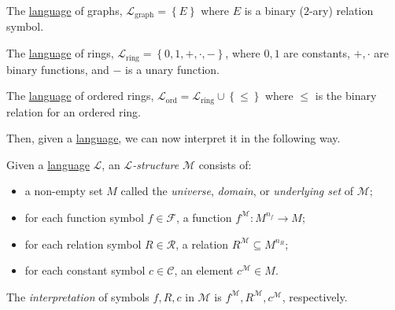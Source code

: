 \begin{eg}[Graph]\label{eg:language-graph}
	The \hyperref[def:language]{language} of graphs, \(\mathcal{L} _{\text{graph} } = \left\{ E \right\}\) where \(E\) is a binary (\(2\)-ary) relation symbol.
\end{eg}

\begin{eg}[Ring]\label{eg:language-ring}
	The \hyperref[def:language]{language} of rings, \(\mathcal{L} _{\text{ring} } = \left\{ 0, 1, +, \cdot, - \right\} \), where \(0, 1\) are constants, \(+, \cdot\) are binary functions, and \(-\) is a unary function.
\end{eg}

\begin{eg}\label{eg:language-ordered-ring}
	The \hyperref[def:language]{language} of ordered rings, \(\mathcal{L} _{\text{ord} } = \mathcal{L} _{\text{ring} } \cup \left\{ \leq \right\} \) where \(\leq \) is the binary relation for an ordered ring.
\end{eg}

Then, given a \hyperref[def:language]{language}, we can now interpret it in the following way.

\begin{definition}[Structure]\label{def:structure}
	Given a \hyperref[def:language]{language} \(\mathcal{L} \), an \emph{\(\mathcal{L} \)-structure} \(\mathcal{M} \) consists of:
	\begin{itemize}
		\item a non-empty set \(M\) called the \emph{universe}, \emph{domain}, or \emph{underlying set} of \(\mathcal{M} \);
		\item for each function symbol \(f\in \mathcal{F} \), a function \(f^{\mathcal{M} } \colon M^{n_f} \to M\);
		\item for each relation symbol \(R\in \mathcal{R} \), a relation \(R^{\mathcal{M} } \subseteq M^{n_R}\);
		\item for each constant symbol \(c\in \mathcal{C} \), an element \(c^{\mathcal{M} }\in M\).
	\end{itemize}
\end{definition}

\begin{notation}[Interpretation]\label{not:interpretation}
	The \emph{interpretation} of symbols \(f, R, c\) in \(\mathcal{M} \) is \(f^{\mathcal{M} }, R^{\mathcal{M} }, c^{\mathcal{M} }\), respectively.
\end{notation}

